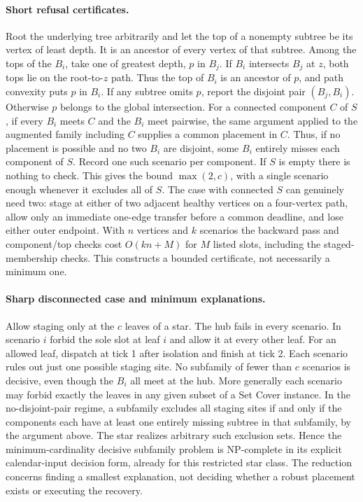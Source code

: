 \documentclass[11pt]{article}
\begin{document}
\paragraph{Short refusal certificates.}
Root the underlying tree arbitrarily and let the top of a nonempty subtree be its vertex of least depth. It is an ancestor of every vertex of that subtree. Among the tops of the $B_i$, take one of greatest depth, $p$ in $B_j$. If $B_i$ intersects $B_j$ at $z$, both tops lie on the root-to-$z$ path. Thus the top of $B_i$ is an ancestor of $p$, and path convexity puts $p$ in $B_i$. If any subtree omits $p$, report the disjoint pair $(B_j,B_i)$. Otherwise $p$ belongs to the global intersection. For a connected component $C$ of $S$, if every $B_i$ meets $C$ and the $B_i$ meet pairwise, the same argument applied to the augmented family including $C$ supplies a common placement in $C$. Thus, if no placement is possible and no two $B_i$ are disjoint, some $B_i$ entirely misses each component of $S$. Record one such scenario per component. If $S$ is empty there is nothing to check. This gives the bound $\max(2,c)$, with a single scenario enough whenever it excludes all of $S$. The case with connected $S$ can genuinely need two: stage at either of two adjacent healthy vertices on a four-vertex path, allow only an immediate one-edge transfer before a common deadline, and lose either outer endpoint. With $n$ vertices and $k$ scenarios the backward pass and component/top checks cost $O(kn+M)$ for $M$ listed slots, including the staged-membership checks. This constructs a bounded certificate, not necessarily a minimum one.

\paragraph{Sharp disconnected case and minimum explanations.}
Allow staging only at the $c$ leaves of a star. The hub fails in every scenario. In scenario $i$ forbid the sole slot at leaf $i$ and allow it at every other leaf. For an allowed leaf, dispatch at tick 1 after isolation and finish at tick 2. Each scenario rules out just one possible staging site. No subfamily of fewer than $c$ scenarios is decisive, even though the $B_i$ all meet at the hub. More generally each scenario may forbid exactly the leaves in any given subset of a Set Cover instance. In the no-disjoint-pair regime, a subfamily excludes all staging sites if and only if the components each have at least one entirely missing subtree in that subfamily, by the argument above. The star realizes arbitrary such exclusion sets. Hence the minimum-cardinality decisive subfamily problem is NP-complete in its explicit calendar-input decision form, already for this restricted star class. The reduction concerns finding a smallest explanation, not deciding whether a robust placement exists or executing the recovery.
\end{document}
